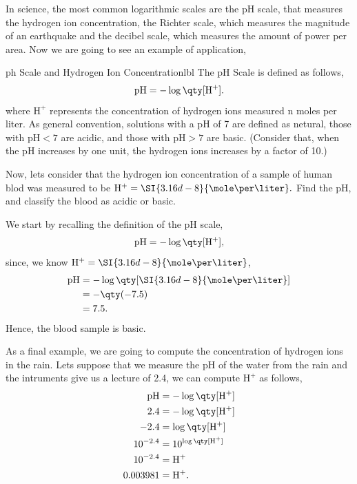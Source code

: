 \documentclass[../main.tex]{subfiles}
\begin{document}
In science, the most common logarithmic scales are the pH scale, that measures the hydrogen ion concentration, the Richter scale, which measures the magnitude of an earthquake and the decibel scale, which measures the amount of power per area.
Now we are going to see an example of application,
\begin{example}{ph Scale and Hydrogen Ion Concentration}{lbl}
   The pH Scale is defined as follows,
   \begin{gather*}
        \mathrm{pH} = -\log\qty[\mathrm{H}^+].
   \end{gather*}
   where $\mathrm{H}^+$ represents the concentration of hydrogen ions measured n moles per liter.
   As general convention, solutions with a pH of 7 are defined as netural, those with $\mathrm{pH}<7$ are acidic, and those with $\mathrm{pH}>7$ are basic.
   (Consider that, when the pH increases by one unit, the hydrogen ions increases by a factor of 10.)

   Now, lets consider that the hydrogen ion concentration of a sample of human blod was measured to be $\mathrm{H}^+=\SI{3.16d-8}{\mole\per\liter}.$
   Find the $\mathrm{pH}$, and classify the blood as acidic or basic.

   We start by recalling the definition of the pH scale,
   \begin{gather*}
        \mathrm{pH} = -\log\qty[\mathrm{H}^+],
   \end{gather*}
   since, we know $\mathrm{H}^+ = \SI{3.16d-8}{\mole\per\liter}$,
    \begin{align*}
        \mathrm{pH} &= -\log\qty[\SI{3.16d-8}{\mole\per\liter}] \\
                    &= -\qty(-7.5) \\
                    &= 7.5.
   \end{align*}
   Hence, the blood sample is basic.

   
   As a final example, we are going to compute the concentration of hydrogen ions in the rain.
   Lets suppose that we measure the pH of the water from the rain and the intruments give us a lecture of 2.4, we can compute $\mathrm{H}^+$ as follows,
   \begin{align*}
        \mathrm{pH} &= -\log\qty[\mathrm{H}^+] \\
        2.4 &=  -\log\qty[\mathrm{H}^+] \\
        -2.4 &= \log\qty[\mathrm{H}^+] \\
        10^{-2.4} &=10^{\log\qty[\mathrm{H}^+]} \\
        10^{-2.4} &=\mathrm{H}^+ \\
        0.003981 &= \mathrm{H}^+. 
   \end{align*}
\end{example}
\end{document}
